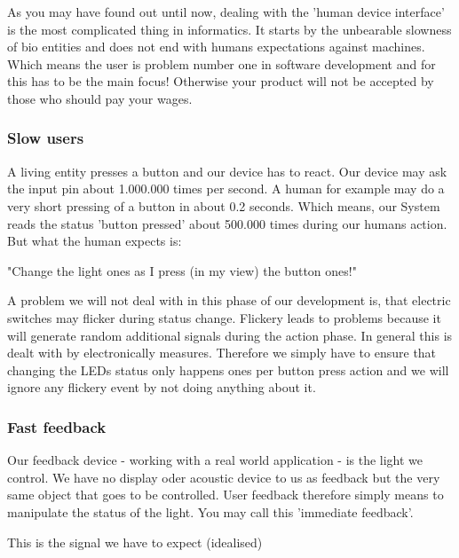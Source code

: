 As you may have found out until now, dealing with the 'human device interface' is the most complicated thing in informatics. It starts by the unbearable slowness of bio entities and does not end with humans expectations against machines. Which means the user is problem number one in software development and for this has to be the main focus! Otherwise your product will not be accepted by those who should pay your wages.

\subsubsection{Slow users}

A living entity presses a button and our device has to react. Our device may ask the input pin about 1.000.000 times per second. A human for example may do a very short pressing of a button in about 0.2 seconds. Which means, our System reads the status 'button pressed' about 500.000 times during our humans action. But what the human expects is:

"Change the light ones as I press (in my view) the button ones!"

A problem we will not deal with in this phase of our development is, that electric switches may flicker during status change. Flickery leads to problems because it will generate random additional signals during the action phase. In general this is dealt with by electronically measures. Therefore we simply have to ensure that changing the LEDs status only happens ones per button press action and we will ignore any flickery event by not doing anything about it.

\subsubsection{Fast feedback}

Our feedback device - working with a real world application - is the light we control. We have no display oder acoustic device to us as feedback but the very same object that goes to be controlled. User feedback therefore simply means to manipulate the status of the light. You may call this 'immediate feedback'.

This is the signal we have to expect (idealised)


